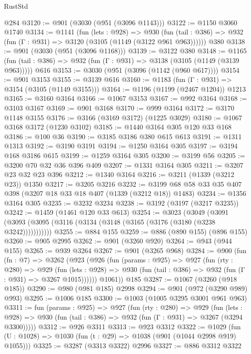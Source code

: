 \begin{lexlean}{RustStd}
\begin{coremodule}
{\begin{coremodule}
{{{{{{{{{{{{{{    @284
@3120 := @901 (@3030 (@951 (@3096 @1143)))
@3122 := @1150 @3060 @1740
@3134 := @1141
    (fun (lets : @928) =>
    @930 (fun (tail : @386) => @932 (fun (Γ : @931) => @3120 (@3105 (@1149 (@3122 @961 @963))))))
    @380
@3138 := @901 (@3030 (@951 (@3096 @1168)))
@3139 := @3122 @380
@3148 := @1165
    (fun (tail : @386) => @932 (fun (Γ : @931) => @3138 (@3105 (@1149 (@3139 @963)))))
    @616
@3153 := @3030 (@951 (@3096 (@1142 (@960 @617))))
@3154 := @901 @3153
@3155 := @3139 @616
@3160 := @1183 (fun (Γ : @931) => @3154 (@3105 (@1149 @3155)))
@3164 := @1196 (@1199 (@2467 @1204)) @1213
@3165 := @3160 @3164
@3166 := @1067 @3153
@3167 := @992 @3164
@3168 := @3103 @3167
@3169 := @901 @3168
@3170 := @999 @3164
@3172 := @3170 @1148 @3155
@3176 := @3166 (@3169 @3172) (@1225 @3029)
@3180 := @1067 @3168 @3172 (@1230 @3102)
@3185 := @1440 @3164 @305 @120 @33 @168
@3186 := @100 @36
@3190 := @3185 @3186 @380 @615 @613
@3191 := @1311 @1313
@3192 := @3190 @3191
@3194 := @1250 @3164 @305
@3197 := @3194 @168 @3186 @615
@3199 := @1259 @3164 @305
@3200 := @3199 @56
@3205 := @3200 @70 @32 @36 @396 @409
@3207 := @1331 @3164 @305
@3211 := @3207 @23 @32 @23 @396
@3212 := @1340 @3164
@3216 := @3211 (@1339 (@3212 @23)) @1350
@3217 := @3205 @3216
@3232 := @3199 @68 @58 @33 @35 @407 @398 (@3207 @18 @33 @18 @407 (@1339 (@3212 @18)) @1483)
@3234 := @1356 @3164 @305
@3235 := @3232 @3234
@3238 := @3192 (@3197 (@3217 @3235))
@3242 := @1459 (@1461 @120 @33 @613)
@3254 := @3023
    (@3049 (@3091 (@3093 (@3095 (@3116 (@3134 (@3148 (@3165 (@3176 (@3180 (@3238 @3242)))))))))))
@3255 := @884 @155
@3259 := @886 (@890 @155) (@896 @155)
@3260 := @905 @2995
@3262 := @901 (@3260 @920)
@3264 := @943 (@944 @155)
@3265 := @939 @3264
@3267 := @901 (@3265 @968)
@3284 := @900
    (fun (fn : @7) =>
    @3262
      (@923
        (@926
          (fun (params : @925) =>
          @927
            (fun (rty : @280) =>
            @929
              (fun (lets : @928) =>
              @930 (fun (tail : @386) => @932 (fun (Γ : @931) => @3267 @1015))))))
        @1061))
    @185
@3287 := @1067 (@3260 (@918 @185))
@3290 := @980 (@981 @185) @2998
@3294 := @901 (@972 (@3290 @989) @993)
@3295 := @1006 @185
@3300 := @1003 (@1005 @3295 @3001 @961 @963)
@3311 := fun (params : @925) =>
  @927
    (fun (rty : @280) =>
    @929
      (fun (lets : @928) =>
      @930 (fun (tail : @386) => @932 (fun (Γ : @931) => @3267 (@3294 @3300)))))
@3312 := @926 @3311
@3313 := @923 @3312
@3322 := @1029 (fun (U : @1028) => @1030 (fun (t : @29) => @1038 (@901 (@1044 @2998 @919) @1055)))
@3325 := @3287 (@3313 @3322) @2996
@3327 := @886 @3312 @3322
}}}}}}}}}}}}}}
\end{coremodule}}
\end{coremodule}
\end{lexlean}
